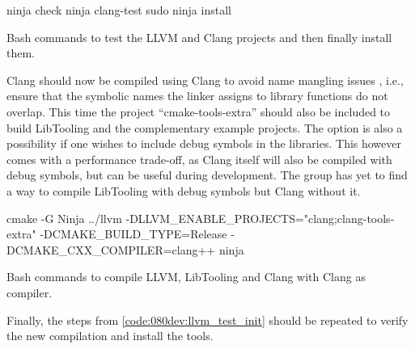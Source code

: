 \begin{listing}[H]
    \begin{bashcode}
ninja check
ninja clang-test
sudo ninja install
    \end{bashcode}
    \caption{Bash commands to test the LLVM and Clang projects and then finally install them.}
    \label{code:080dev:llvm_test_init}
\end{listing}

Clang should now be compiled using Clang to avoid name mangling issues \cite{ibmIBMDocumentation2021}, i.e., ensure that the symbolic names the linker assigns to library functions do not overlap. This time the project ``cmake-tools-extra'' should also be included to build LibTooling and the complementary example projects.
The option  is also a possibility if one wishes to include debug symbols in the libraries. This however comes with a performance trade-off, as Clang itself will also be compiled with debug symbols, but can be useful during development.
The group has yet to find a way to compile LibTooling with debug symbols but Clang without it.

\begin{listing}[H]
    \begin{bashcode}
cmake -G Ninja ../llvm -DLLVM_ENABLE_PROJECTS="clang;clang-tools-extra" -DCMAKE_BUILD_TYPE=Release -DCMAKE_CXX_COMPILER=clang++
ninja
    \end{bashcode}
    \caption{Bash commands to compile LLVM, LibTooling and Clang with Clang as compiler.}
    \label{code:080dev:llvm_compile_final}
\end{listing}

Finally, the steps from \cref{code:080dev:llvm_test_init} should be repeated to verify the new compilation and install the tools.